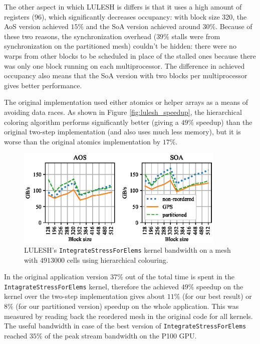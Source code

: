 The other aspect in which LULESH is differs is that it uses a high amount of
registers ($96$), which significantly decreases occupancy: with block size 320, 
the AoS version achieved $15\%$ and the SoA version achieved around $30\%$. 
Because of these two reasons, the synchronization overhead ($39\%$ stalls were 
from synchronization on the partitioned mesh) couldn't be hidden: there were no 
warps from other blocks to be scheduled in place of the stalled ones because
there was only one block running on each multiprocessor. The difference in 
achieved occupancy also means that the SoA version with two blocks 
per multiprocessor gives better performance.

The original implementation used either atomics or helper arrays as a means of
avoiding data races. As shown in Figure \ref{fig:lulesh_speedup}, the
hierarchical coloring algorithm performs significantly better (giving a $49\%$
speedup) than the original two-step implementation (and also uses much less
memory), but it is worse than the original atomics implementation by $17\%$.

 
\begin{figure}[Htbp]
\centering
\includegraphics[width=10cm]{fig/lulesh_bw-vs-bs_hier.eps}
\caption{LULESH's \texttt{IntegrateStressForElems} kernel bandwidth on a mesh 
with $4913000$ cells using hierarchical colouring.}
  \label{fig:lulesh_bw-vs-bs_hier}
\end{figure}

In the original application version $37\%$ out of the total time is spent in
the \texttt{IntagrateStressForElems} kernel, therefore the achieved $49\%$
speedup on the kernel over the two-step implementation gives about $11\%$ (for
our best result) or $8\%$ (for our partitioned version) speedup on the whole
application. This was measured by reading back the reordered mesh in the
original code for all kernels. The useful bandwidth in case of the best version
of \texttt{IntegrateStressForElems} reached $35\%$ of the peak stream bandwidth
on the P100 GPU.

